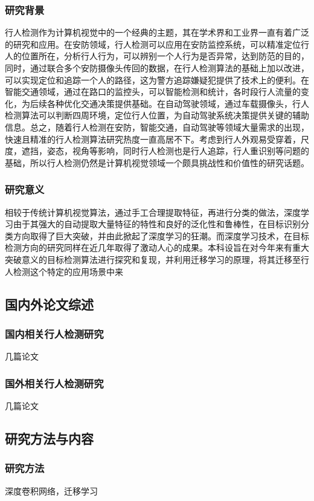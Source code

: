 \documentclass[12pt,a4paper,titlepage]{article}
\begin{document}
\subsubsection{研究背景}
行人检测作为计算机视觉中的一个经典的主题，其在学术界和工业界一直有着广泛的研究和应用。在安防领域，行人检测可以应用在安防监控系统，可以精准定位行人的位置所在，分析行人行为，可以辨别一个人行为是否异常，达到防范的目的，同时，通过联合多个安防摄像头传回的数据，在行人检测算法的基础上加以改进，可以实现定位和追踪一个人的路径，这为警方追踪嫌疑犯提供了技术上的便利。在智能交通领域，通过在路口的监控头，可以智能检测和统计，各时段行人流量的变化，为后续各种优化交通决策提供基础。在自动驾驶领域，通过车载摄像头，行人检测算法可以判断四周环境，定位行人位置，为自动驾驶系统决策提供关键的辅助信息。总之，随着行人检测在安防，智能交通，自动驾驶等领域大量需求的出现，快速且精准的行人检测算法研究热度一直高居不下。考虑到行人外观易受穿着，尺度，遮挡，姿态，视角等影响，同时行人检测也是行人追踪，行人重识别等问题的基础，所以行人检测仍然是计算机视觉领域一个颇具挑战性和价值性的研究话题。
\subsubsection{研究意义}
相较于传统计算机视觉算法，通过手工合理提取特征，再进行分类的做法，深度学习由于其强大的自动提取大量特征的特性和良好的泛化性和鲁棒性，在目标识别分类方向取得了巨大突破，并由此掀起了深度学习的狂潮。而深度学习技术，在目标检测方向的研究同样在近几年取得了激动人心的成果。本科设旨在对今年来有重大突破意义的目标检测算法进行探究和复现，并利用迁移学习的原理，将其迁移至行人检测这个特定的应用场景中来

\subsection{国内外论文综述}
\subsubsection{国内相关行人检测研究}
几篇论文
\subsubsection{国外相关行人检测研究}
几篇论文

\subsection{研究方法与内容}
\subsubsection{研究方法}
深度卷积网络，迁移学习
\end{document}
